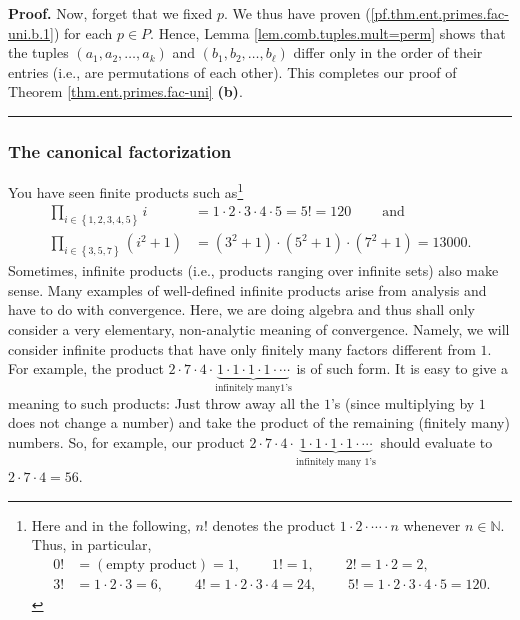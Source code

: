 \documentclass[numbers=enddot,12pt,final,onecolumn,notitlepage]{scrartcl}%
\numberwithin{exer}{subsection}
\theoremstyle{definition}
\newenvironment{proof}[1][Proof]{\noindent\textbf{#1.} }{\ \rule{0.5em}{0.5em}}
\let\prodnonlimits\prod
\renewcommand{\prod}{\prodnonlimits\limits}
\begin{document}
\begin{proof}
Now, forget that we fixed $p$. We thus have proven
(\ref{pf.thm.ent.primes.fac-uni.b.1}) for each $p\in P$. Hence, Lemma
\ref{lem.comb.tuples.mult=perm} shows that the tuples $\left(  a_{1}%
,a_{2},\ldots,a_{k}\right)  $ and $\left(  b_{1},b_{2},\ldots,b_{\ell}\right)
$ differ only in the order of their entries (i.e., are permutations of each
other). This completes our proof of Theorem \ref{thm.ent.primes.fac-uni}
\textbf{(b)}.
\end{proof}

\subsubsection{The canonical factorization}

You have seen finite products such as\footnote{Here and in the following, $n!$
denotes the product $1\cdot2\cdot\cdots\cdot n$ whenever $n\in\mathbb{N}$.
Thus, in particular,
\begin{align*}
0!  &  =\left(  \text{empty product}\right)
=1,\ \ \ \ \ \ \ \ \ \ 1!=1,\ \ \ \ \ \ \ \ \ \ 2!=1\cdot2=2,\\
3!  &  =1\cdot2\cdot3=6,\ \ \ \ \ \ \ \ \ \ 4!=1\cdot2\cdot3\cdot
4=24,\ \ \ \ \ \ \ \ \ \ 5!=1\cdot2\cdot3\cdot4\cdot5=120.
\end{align*}
}
\begin{align*}
\prod_{i\in\left\{  1,2,3,4,5\right\}  }i  &  =1\cdot2\cdot3\cdot
4\cdot5=5!=120\ \ \ \ \ \ \ \ \ \ \text{and}\\
\prod_{i\in\left\{  3,5,7\right\}  }\left(  i^{2}+1\right)   &  =\left(
3^{2}+1\right)  \cdot\left(  5^{2}+1\right)  \cdot\left(  7^{2}+1\right)
=13000.
\end{align*}
Sometimes, infinite products (i.e., products ranging over infinite sets) also
make sense. Many examples of well-defined infinite products arise from
analysis and have to do with convergence. Here, we are doing algebra and thus
shall only consider a very elementary, non-analytic meaning of convergence.
Namely, we will consider infinite products that have only finitely many
factors different from $1$. For example, the product $2\cdot7\cdot
4\cdot\underbrace{1\cdot1\cdot1\cdot1\cdot\cdots}_{\text{infinitely many
}1\text{'s}}$ is of such form. It is easy to give a meaning to such products:
Just throw away all the $1$'s (since multiplying by $1$ does not change a
number) and take the product of the remaining (finitely many) numbers. So, for
example, our product $2\cdot7\cdot4\cdot\underbrace{1\cdot1\cdot1\cdot
1\cdot\cdots}_{\text{infinitely many }1\text{'s}}$ should evaluate to
$2\cdot7\cdot4=56$.
\end{document}
